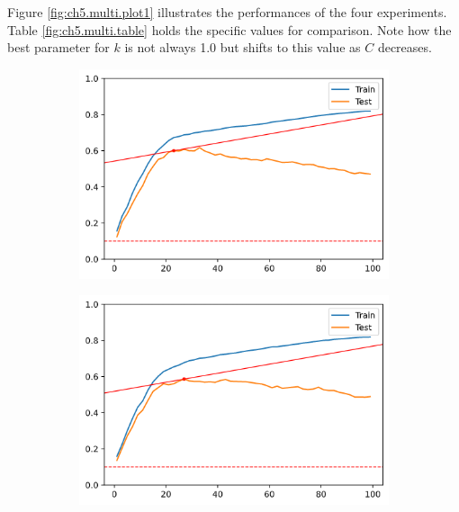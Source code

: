 Figure \ref{fig:ch5.multi.plot1} illustrates the performances of the four experiments. Table \ref{fig:ch5.multi.table} holds the specific values for comparison. Note how the best parameter for $k$ is not always 1.0 but shifts to this value as $C$ decreases.

\begin{figure}[h]
    \centering
    \begin{subfigure}[b]{0.4\linewidth}
        \includegraphics[width=\linewidth]{img/ch5/multi/w-l1.png}
    \end{subfigure}
    \begin{subfigure}[b]{0.4\linewidth}
        \includegraphics[width=\linewidth]{img/ch5/multi/w-l2.png}
    \end{subfigure}
    \begin{subfigure}[b]{0.4\linewidth}

\end{subfigure}
\end{figure}
